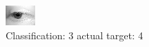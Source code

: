 \begin{figure}[h!]
\begin{center}
\includegraphics[width=0.60\columnwidth]{figures/ID2620_class_3_target_4.png}
\end{center}
\caption{ Classification: 3 actual target: 4}
\label{fig:ID2620_class_3_target_4}
\end{figure}
